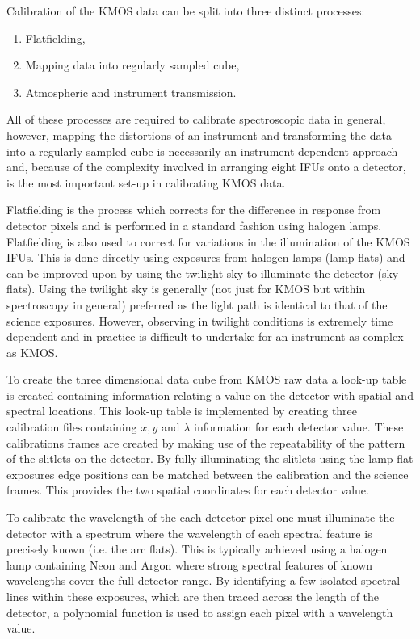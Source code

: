 Calibration of the KMOS data can be split into three distinct processes:

\begin{enumerate}
    \item Flatfielding,
    \item Mapping data into regularly sampled cube,
    \item Atmospheric and instrument transmission.
\end{enumerate}

All of these processes are required to calibrate spectroscopic data in general, however, mapping the distortions of an instrument and transforming the data into a regularly sampled cube is necessarily an instrument dependent approach and,
because of the complexity involved in arranging eight IFUs onto a detector, is the most important set-up in calibrating KMOS data.

Flatfielding is the process which corrects for the difference in response from detector pixels and is performed in a standard fashion using halogen lamps.
Flatfielding is also used to correct for variations in the illumination of the KMOS IFUs.
This is done directly using exposures from halogen lamps (lamp flats) and can be improved upon by using the twilight sky to illuminate the detector (sky flats).
Using the twilight sky is generally (not just for KMOS but within spectroscopy in general) preferred as the light path is identical to that of the science exposures.
However, observing in twilight conditions is extremely time dependent and in practice is difficult to undertake for an instrument as complex as KMOS.

To create the three dimensional data cube from KMOS raw data a look-up table is created containing information relating a value on the detector with spatial and spectral locations.
This look-up table is implemented by creating three calibration files containing $x, y$ and $\lambda$ information for each detector value.
These calibrations frames are created by making use of the repeatability of the pattern of the slitlets on the detector.
By fully illuminating the slitlets using the lamp-flat exposures edge positions can be matched between the calibration and the science frames.
This provides the two spatial coordinates for each detector value.

To calibrate the wavelength of the each detector pixel one must illuminate the detector with a spectrum where the wavelength of each spectral feature is precisely known (i.e. the arc flats).
This is typically achieved using a halogen lamp containing Neon and Argon where strong spectral features of known wavelengths cover the full detector range.
By identifying a few isolated spectral lines within these exposures, which are then traced across the length of the detector, a polynomial function is used to assign each pixel with a wavelength value.

